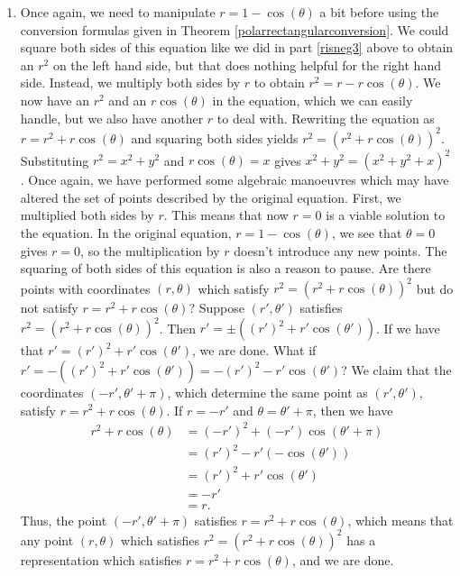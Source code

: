 {\begin{enumerate}
\enlargethispage{2\baselineskip}

\item  Once again, we need to manipulate   $r = 1 - \cos(\theta)$ a bit before using the conversion formulas given in Theorem \ref{polarrectangularconversion}.  We could square both sides of this equation like we did in part \ref{risneg3} above to obtain an $r^2$ on the left hand side, but that does nothing helpful for the right hand side.  Instead, we multiply both sides by $r$ to obtain  $r^{2} = r - r\cos(\theta)$.  We now have an $r^2$ and an $r\cos(\theta)$ in the equation, which we can easily handle, but we also have another $r$ to deal with.  Rewriting the equation as $r = r^{2} + r\cos(\theta)$ and squaring both sides yields $r^2 = \left(r^2 + r\cos(\theta)\right)^2$.  Substituting $r^2 = x^2 + y^2$ and $r\cos(\theta) = x$ gives   $x^2 + y^2 = \left(x^2 + y^2 + x\right)^2$.  Once again, we have performed some algebraic manoeuvres which may have altered the set of points described by the original equation.  First, we multiplied both sides by $r$.  This means that now $r=0$ is a viable solution to the equation.  In the original equation, $r = 1 - \cos(\theta)$, we see that $\theta = 0$ gives $r=0$, so the multiplication by $r$ doesn't introduce any new points. The squaring of both sides of this equation is also a reason to pause.  Are there points with coordinates $(r,\theta)$ which satisfy $r^2 = \left(r^2 + r\cos(\theta)\right)^2$ but do not satisfy $r = r^2 + r\cos(\theta)$?  Suppose $\left(r',\theta'\right)$ satisfies $r^2 = \left(r^2 + r\cos(\theta)\right)^2$.  Then $r' = \pm \left((r')^2 + r'\cos(\theta')\right)$.  If we have that $r' = (r')^2 + r'\cos(\theta')$, we are done.  What if $r' = -\left((r')^2 + r'\cos(\theta')\right) = -(r')^{2} - r'\cos(\theta')$?  We claim that the coordinates $(-r', \theta' + \pi)$, which determine the same point as $(r',\theta')$, satisfy $r = r^2 + r\cos(\theta)$. If $r =  -r'$ and $\theta = \theta' + \pi$, then we have
\begin{align*}
r^2+r\cos(\theta) & = (-r')^2+(-r')\cos(\theta'+\pi)\\
& = (r')^2-r'(-\cos(\theta')) \tag*{Since $\cos(\theta'+\pi)=-\cos(\theta')$}\\
& = (r')^2+r'\cos(\theta')\\
& = -r' \tag*{Since $r' = -(r')^2-r'\cos(\theta')$}\\
& = r.
\end{align*}
Thus, the point $(-r', \theta' + \pi)$ satisfies $r = r^2 + r\cos(\theta)$, which means that any point $(r,\theta)$ which satisfies $r^2 = \left(r^2 + r\cos(\theta)\right)^2$ has a representation which satisfies  $r = r^2 + r\cos(\theta)$, and we are done. 

\end{enumerate}
}

